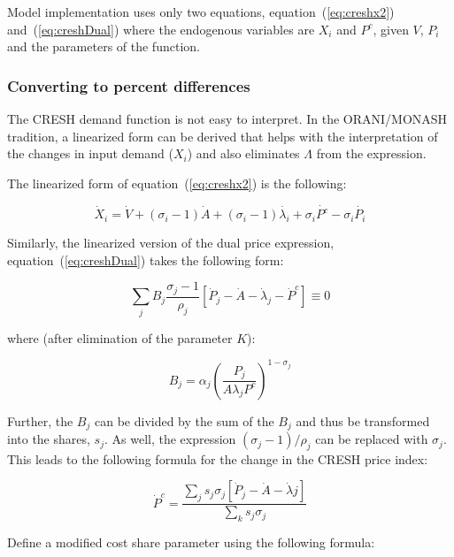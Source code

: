 Model implementation uses only two equations, equation~(\ref{eq:creshx2}) and~(\ref{eq:creshDual})
where the endogenous variables are $X_i$ and $P^c$, given $V$, $P_i$ and the parameters of the function.

\subsubsection{Converting to percent differences}

The CRESH demand function is not easy to interpret. In the ORANI/MONASH tradition, a
linearized form can be derived that helps with the interpretation of the changes
in input demand ($X_i$) and also eliminates $\Lambda$ from the expression.

The linearized form of equation~(\ref{eq:creshx2}) is the following:

\begin{equation}
\label{eq:creshlin1}
\dot X_i = \dot V + (\sigma_i-1) \dot A + (\sigma_i-1) \dot {\lambda_i}
+ \sigma_i \dot {P^c} - \sigma_{i} \dot {P_i}
\end{equation}

\noindent Similarly, the linearized version of the dual price expression, equation~(\ref{eq:creshDual})
takes the following form:

\begin{displaymath}
\sum_j{B_j\frac{\sigma_j-1}{\rho_j} \left[ \dot P_j - \dot A -\dot \lambda_j - \dot P^c \right]} \equiv 0
\end{displaymath}

\noindent where (after elimination of the parameter $K$):

\begin{displaymath}
B_j = {\alpha_j} \left( \frac{P_j} {A \lambda_j P^c} \right)^{1-\sigma_j}
\end{displaymath}

Further, the $B_j$ can be divided by the sum of the $B_j$ and thus be transformed into
the shares, $s_j$. As well, the expression $(\sigma_j-1)/\rho_j$ can be replaced with $\sigma_j$.
This leads to the following formula for the change in the CRESH price index:

\begin{displaymath}
\dot P^c = \frac {\displaystyle \sum_j{s_j}\sigma_j\left[ \dot P_j - \dot A -\dot \lambda j \right]}
{\displaystyle \sum_k{s_j \sigma_j}}
\end{displaymath}

\noindent Define a modified cost share parameter using the following formula:

